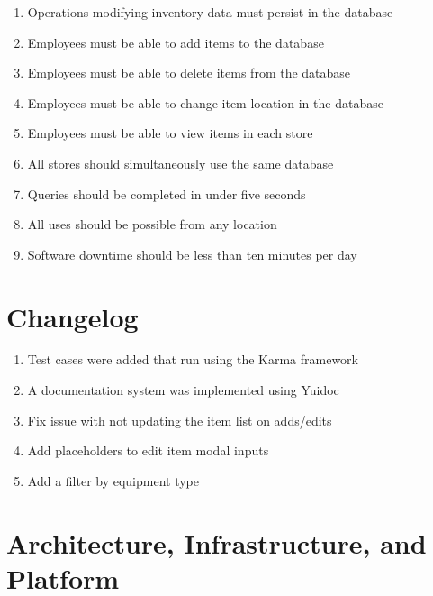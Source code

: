 \documentclass[letterpaper, 12pt]{article}
\begin{document}
\begin{enumerate}
\item Operations modifying inventory data must persist in the database
\item Employees must be able to add items to the database
\item Employees must be able to delete items from the database
\item Employees must be able to change item location in the database
\item Employees must be able to view items in each store
\item All stores should simultaneously use the same database
\item Queries should be completed in under five seconds
\item All uses should be possible from any location
\item Software downtime should be less than ten minutes per day
\end{enumerate}



%
%


\section{Changelog}
\begin{enumerate}
\item Test cases were added that run using the Karma framework
\item A documentation system was implemented using Yuidoc
\item Fix issue with not updating the item list on adds/edits
\item Add placeholders to edit item modal inputs
\item Add a filter by equipment type
\end{enumerate}

\section{Architecture, Infrastructure, and Platform}
\end{document}
